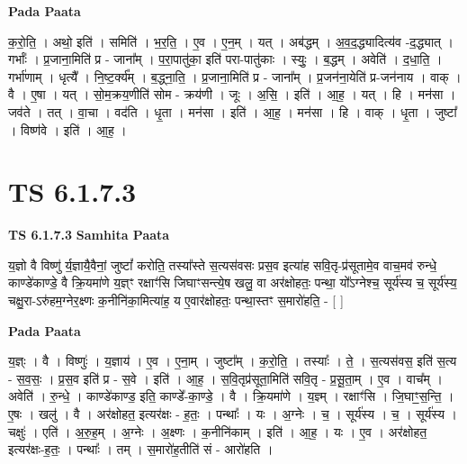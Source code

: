 \documentclass[17pt]{extarticle}
\begin{document}
\textbf{Pada Paata} \newline

क॒रो॒ति॒ । अथो॒ इति॑ । समिति॑ । भ॒र॒ति॒ । ए॒व । ए॒न॒म् । यत् । अब॑द्धम् । अ॒व॒द॒द्ध्यादित्य॑व -द॒द्ध्यात् । गर्भाः᳚ । प्र॒जाना॒मिति॑ प्र - जाना᳚म् । प॒रा॒पातु॑का॒ इति॑ परा-पातु॑काः । स्युः॒ । ब॒द्धम् । अवेति॑ । द॒धा॒ति॒ । गर्भा॑णाम् । धृत्यै᳚ । नि॒ष्ट॒र्क्य᳚म् । ब॒द्ध्ना॒ति॒ । प्र॒जाना॒मिति॑ प्र - जाना᳚म् । प्र॒जन॑ना॒येति॑ प्र-जन॑नाय । वाक् । वै । ए॒षा । यत् । सो॒म॒क्रय॒णीति॑ सोम - क्रय॑णी । जूः । अ॒सि॒ । इति॑ । आ॒ह॒ । यत् । हि । मन॑सा । जव॑ते । तत् । वा॒चा । वद॑ति । धृ॒ता । मन॑सा । इति॑ । आ॒ह॒ । मन॑सा । हि । वाक् । धृ॒ता । जुष्टा᳚ । विष्ण॑वे । इति॑ । आ॒ह॒ ।  \newline




\section*{ TS 6.1.7.3 }

\textbf{TS 6.1.7.3 } \newline
\textbf{Samhita Paata} \newline

य॒ज्ञो वै विष्णु॑ र्य॒ज्ञायै॒वैनां॒ जुष्टां᳚ करोति॒ तस्या᳚स्ते स॒त्यस॑वसः प्रस॒व इत्या॑ह सवि॒तृ-प्र॑सूतामे॒व वाच॒मव॑ रुन्धे॒ काण्डे॑काण्डे॒ वै क्रि॒यमा॑णे य॒ज्ञ्ꣳ रक्षाꣳ॑सि जिघाꣳसन्त्ये॒ष खलु॒ वा अर॑क्षोहतः॒ पन्था॒ यो᳚ऽग्नेश्च॒ सूर्य॑स्य च॒ सूर्य॑स्य॒ चक्षु॒रा-ऽरु॑हम॒ग्नेर॒क्ष्णः क॒नीनि॑का॒मित्या॑ह॒ य ए॒वार॑क्षोहतः॒ पन्था॒स्तꣳ स॒मारो॑हति॒ - [  ] \newline

\textbf{Pada Paata} \newline

य॒ज्ञ्ः । वै । विष्णुः॑ । य॒ज्ञाय॑ । ए॒व । ए॒ना॒म् । जुष्टा᳚म् । क॒रो॒ति॒ । तस्याः᳚ । ते॒ । स॒त्यस॑वस॒ इति॑ स॒त्य - स॒व॒सः॒ । प्र॒स॒व इति॑ प्र - स॒वे । इति॑ । आ॒ह॒ । स॒वि॒तृप्र॑सूता॒मिति॑ सवि॒तृ - प्र॒सू॒ता॒म् । ए॒व । वाच᳚म् । अवेति॑ । रु॒न्धे॒ । काण्डे॑काण्ड॒ इति॒ काण्डे᳚-का॒ण्डे॒ । वै । क्रि॒यमा॑णे । य॒ज्ञ्म् । रक्षाꣳ॑सि । जि॒घाꣳ॒॒स॒न्ति॒ । ए॒षः । खलु॑ । वै । अर॑क्षोहत॒ इत्यर॑क्षः - ह॒तः॒ । पन्थाः᳚ । यः । अ॒ग्नेः । च॒ । सूर्य॑स्य । च॒ । सूर्य॑स्य । चक्षुः॑ । एति॑ । अ॒रु॒ह॒म् । अ॒ग्नेः । अ॒क्ष्णः । क॒नीनि॑काम् । इति॑ । आ॒ह॒ । यः । ए॒व । अर॑क्षोहत॒ इत्यर॑क्षः-ह॒तः॒ । पन्थाः᳚ । तम् । स॒मारो॑ह॒तीति॑ सं - आरो॑हति ।  \newline
\end{document}
